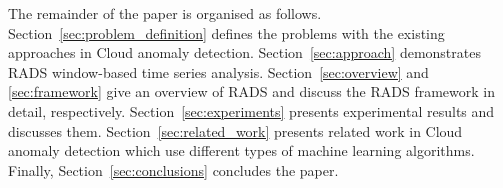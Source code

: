 The remainder of the paper is organised as follows. Section~\ref{sec:problem_definition} defines the problems with the existing approaches in Cloud anomaly detection.
Section~\ref{sec:approach} demonstrates RADS window-based time series analysis. Section~\ref{sec:overview} and \ref{sec:framework} give an overview of RADS and discuss the RADS framework in detail, respectively. 
Section~\ref{sec:experiments} presents experimental results and discusses them. 
Section~\ref{sec:related_work} presents related work in Cloud anomaly detection which use different types of machine learning algorithms.
Finally, Section~\ref{sec:conclusions} concludes the paper. 
